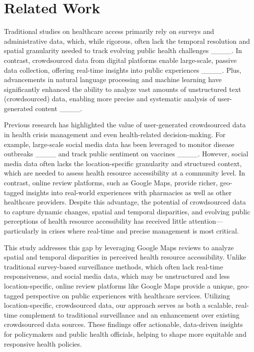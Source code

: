 \section{Related Work}
Traditional studies on healthcare access primarily rely on surveys and administrative data, which, while rigorous, often lack the temporal resolution and spatial granularity needed to track evolving public health challenges ____. In contrast, crowdsourced data from digital platforms enable large-scale, passive data collection, offering real-time insights into public experiences ____. Plus, advancements in natural language processing and machine learning have significantly enhanced the ability to analyze vast amounts of unstructured text (crowdsourced) data, enabling more precise and systematic analysis of user-generated content ____.

Previous research has highlighted the value of user-generated crowdsourced data in health crisis management and even health-related decision-making. For example, large-scale social media data has been leveraged to monitor disease outbreaks ____ and track public sentiment on vaccines ____. However, social media data often lacks the location-specific granularity and structured context, which are needed to assess health resource accessibility at a community level. In contrast, online review platforms, such as Google Maps, provide richer, geo-tagged insights into real-world experiences with pharmacies as well as other healthcare providers. Despite this advantage, the potential of crowdsourced data to capture dynamic changes, spatial and temporal disparities, and evolving public perceptions of health resource accessibility has received little attention—particularly in crises where real-time and precise management is most critical.

This study addresses this gap by leveraging Google Maps reviews to analyze spatial and temporal disparities in perceived health resource accessibility. Unlike traditional survey-based surveillance methods, which often lack real-time responsiveness, and social media data, which may be unstructured and less location-specific, online review platforms like Google Maps provide a unique, geo-tagged perspective on public experiences with healthcare services. Utilizing location-specific, crowdsourced data, our approach serves as both a scalable, real-time complement to traditional surveillance and an enhancement over existing crowdsourced data sources. These findings offer actionable, data-driven insights for policymakers and public health officials, helping to shape more equitable and responsive health policies.